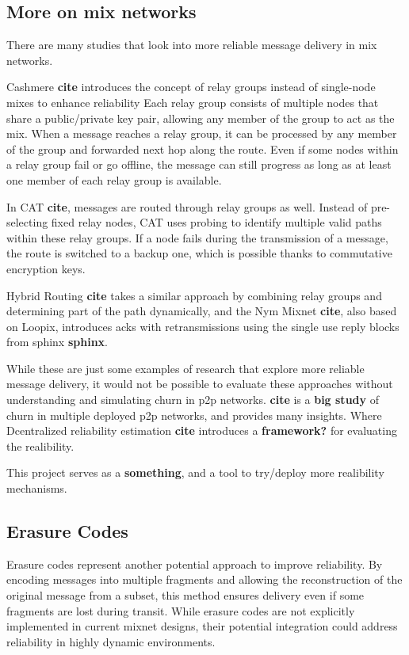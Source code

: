 \documentclass[a4paper,11pt,oneside]{report}
\begin{document}
\subsection{More on mix networks}

 There are many studies that look into more reliable message delivery in mix networks.

Cashmere \textbf{cite} introduces the concept of relay groups instead of single-node mixes to enhance reliability Each relay group consists of multiple nodes that share a public/private key pair, allowing any member of the group to act as the mix. When a message reaches a relay group, it can be processed by any member of the group and forwarded next hop along the route. Even if some nodes within a relay group fail or go offline, the message can still progress as long as at least one member of each relay group is available.

In CAT \textbf{cite}, messages are routed through relay groups as well. Instead of pre-selecting fixed relay nodes, CAT uses probing to identify multiple valid paths within these relay groups. If a node fails during the transmission of a message, the route is switched to a backup one, which is possible thanks to commutative encryption keys.

Hybrid Routing \textbf{cite} takes a similar approach by combining relay groups and determining part of the path dynamically, and the Nym Mixnet \textbf{cite}, also based on Loopix, introduces acks with retransmissions using the single use reply blocks from sphinx \textbf{sphinx}.

While these are just some examples of research that explore more reliable message delivery, it would not be possible to evaluate these approaches without understanding and simulating churn in p2p networks. \textbf{cite} is a \textbf{big study} of churn in multiple deployed p2p networks, and provides many insights. Where Dcentralized reliability estimation \textbf{cite} introduces a \textbf{framework?} for evaluating the realibility.

This project serves as a \textbf{something}, and a tool to try/deploy more realibility mechanisms.

\subsection{Erasure Codes}
Erasure codes represent another potential approach to improve reliability. By encoding messages into multiple fragments and allowing the reconstruction of the original message from a subset, this method ensures delivery even if some fragments are lost during transit. While erasure codes are not explicitly implemented in current mixnet designs, their potential integration could address reliability in highly dynamic environments.
\end{document}
